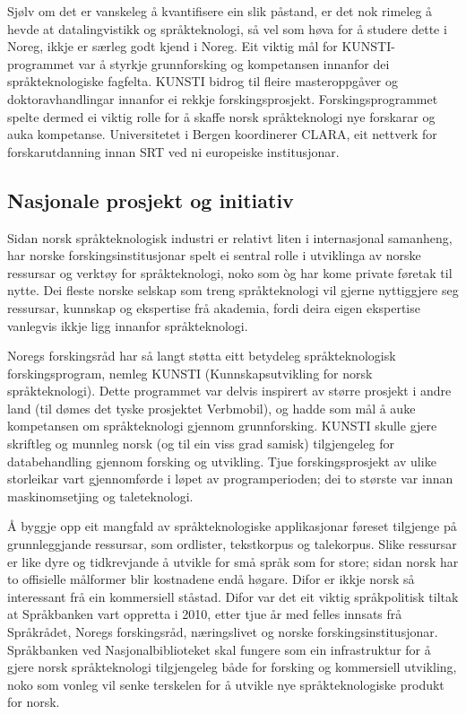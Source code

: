 \begin{multicols}{2}
Sjølv om det er vanskeleg å kvantifisere ein slik påstand, er det nok rimeleg å hevde at datalingvistikk og språkteknologi, så vel som høva for å studere dette i Noreg, ikkje er særleg godt kjend i Noreg. Eit viktig mål for KUNSTI-programmet var å styrkje grunnforsking og kompetansen innanfor dei språkteknologiske fagfelta. KUNSTI bidrog til fleire masteroppgåver og doktoravhandlingar innanfor ei rekkje forskingsprosjekt. Forskingsprogrammet spelte dermed ei viktig rolle for å skaffe norsk språkteknologi nye forskarar og auka kompetanse. Universitetet i Bergen koordinerer CLARA, eit nettverk for forskarutdanning innan SRT ved ni europeiske institusjonar.

\subsection{Nasjonale prosjekt og initiativ}

Sidan norsk språkteknologisk industri er relativt liten i internasjonal samanheng, har norske forskingsinstitusjonar spelt ei sentral rolle i utviklinga av norske ressursar og verktøy for språkteknologi, noko som òg har kome private føretak til nytte. 
Dei fleste norske selskap som treng språkteknologi vil gjerne nyttiggjere seg ressursar, kunnskap og ekspertise frå akademia, fordi deira eigen ekspertise vanlegvis ikkje ligg innanfor språkteknologi. 

Noregs forskingsråd har så langt støtta eitt betydeleg språkteknologisk forskingsprogram, nemleg KUNSTI (Kunnskapsutvikling for norsk språkteknologi). 
Dette programmet var delvis inspirert av større prosjekt i andre land (til dømes det tyske prosjektet Verbmobil), og hadde som mål å auke kompetansen om språkteknologi gjennom grunnforsking. KUNSTI skulle gjere skriftleg og munnleg norsk (og til ein viss grad samisk) tilgjengeleg for databehandling gjennom forsking og utvikling. Tjue forskingsprosjekt av ulike storleikar vart gjennomførde i løpet av programperioden; dei to største var innan maskinomsetjing og taleteknologi.



Å byggje opp eit mangfald av språkteknologiske applikasjonar føreset tilgjenge på grunnleggjande ressursar, som ordlister, tekstkorpus og talekorpus. Slike ressursar er like dyre og tidkrevjande å utvikle for små språk som for store; sidan norsk har to offisielle målformer blir kostnadene endå høgare. 
Difor er ikkje norsk så interessant frå ein kommersiell ståstad. Difor var det eit viktig språkpolitisk tiltak at Språkbanken vart oppretta i 2010, etter tjue år med felles innsats frå Språkrådet, Noregs forskingsråd, næringslivet og norske forskingsinstitusjonar. Språkbanken ved Nasjonalbiblioteket skal fungere som ein infrastruktur for å gjere norsk språkteknologi tilgjengeleg både for forsking og kommersiell utvikling, noko som vonleg vil senke terskelen for å utvikle nye språkteknologiske produkt for norsk. 


\end{multicols}
